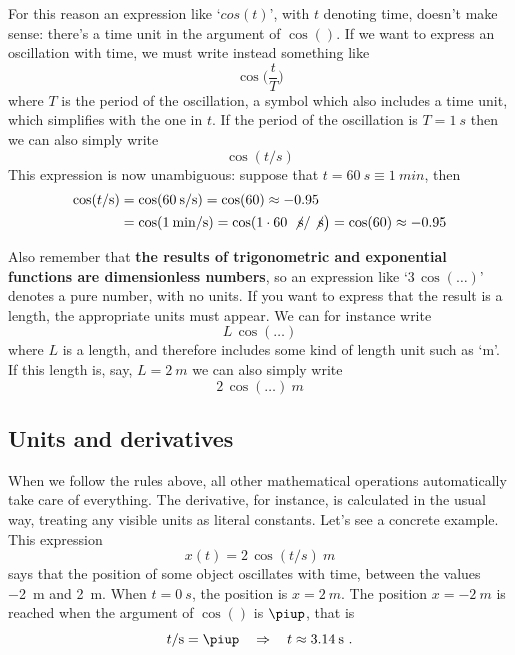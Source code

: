 \documentclass[a4paper,12pt,%
onecolumn,oneside,titlepage,%
british%
]{memoir}
\newcommand*{\pu}{\piup}%
\newcommand*{\limplies}{\mathbin{\Rightarrow}}%
\renewcommand*{\|}[1][]{\nonscript\:#1\vert\nonscript\:\mathopen{}}
\begin{document}
For this reason an expression like \enquote*{$cos(t)$}, with $t$ denoting time, doesn't make sense: there's a time unit in the argument of $\cos()$. If we want to express an oscillation with time, we must write instead something like
\begin{equation*}
  \cos\biggl(\frac{t}{T}\biggr)
\end{equation*}
where $T$ is the period of the oscillation, a symbol which also includes a time unit, which simplifies with the one in $t$. If the period of the oscillation is $T=\qty{1}{s}$ then we can also simply write
\begin{equation*}
  \cos(t/\unit{s})
\end{equation*}
This expression is now unambiguous: suppose that $t=\qty{60}{s}\equiv\qty{1}{min}$, then
\begin{equation*}
  \begin{aligned}
    \cos(t/\unit{s})
    &= \cos(\qty{60}{s}/\unit{s}) =\cos(60) \approx -0.95
    \\
    &= \cos(\qty{1}{min}/\unit{s}) =\cos(1\cdot 60\:\not\unit{s}/\not\unit{s}\bigr)
=\cos(60) \approx -0.95
  \end{aligned}
\end{equation*}

\smallskip

Also remember that \textbf{the results of trigonometric and exponential functions are dimensionless numbers}, so an expression like \enquote*{$3\,\cos(\dotso)$} denotes a pure number, with no units. If you want to express that the result is a length, the appropriate units must appear. We can for instance write
\begin{equation*}
  L\,\cos(\dotso)
\end{equation*}
where $L$ is a length, and therefore includes some kind of length unit such as \enquote*{\unit{m}}. If this length is, say, $L=\qty{2}{m}$ we can also simply write
\begin{equation*}
  2\,\cos(\dotso)\:\unit{m}
\end{equation*}

\subsection{Units and derivatives}
\label{sec:units_derivatives}

When we follow the rules above, all other mathematical operations automatically take care of everything. The derivative, for instance, is calculated in the usual way, treating any visible units as literal constants. Let's see a concrete example. This expression
\begin{equation*}
x(t) = 2\,\cos(t/\unit{s})\:\unit{m}
\end{equation*}
says that the position of some object oscillates with time, between the values \qty{-2}{m} and \qty{+2}{m}. When $t=\qty{0}{s}$, the position is $x=\qty{+2}{m}$. The position $x=\qty{-2}{m}$ is reached when the argument of $\cos()$ is $\pu$, that is
\begin{equation*}
  t/\unit{s} = \pu \quad\limplies\quad t\approx \qty{3.14}{s} \ .
\end{equation*}
\end{document}

